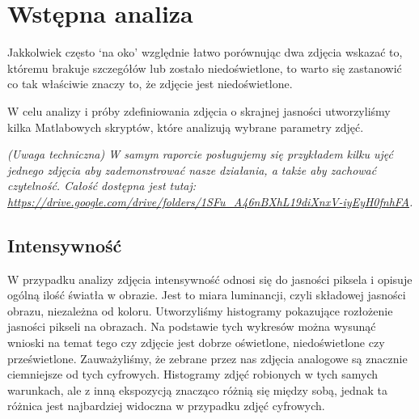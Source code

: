 \documentclass[]{mwart}
\begin{document}
\section{Wstępna analiza}
Jakkolwiek często `na oko' względnie łatwo porównując dwa zdjęcia wskazać
to, któremu brakuje szczegółów lub zostało niedoświetlone, to warto się
zastanowić co tak właściwie znaczy to, że zdjęcie jest niedoświetlone. \newline

W celu analizy i próby zdefiniowania zdjęcia o skrajnej jasności
utworzyliśmy kilka Matlabowych skryptów, które analizują wybrane
parametry zdjęć. \newline

\textit{(Uwaga techniczna) W samym raporcie posługujemy się przykładem
    kilku ujęć jednego zdjęcia aby zademonstrować nasze działania, a także
    aby zachować czytelność. Całość dostępna jest tutaj: \url{https://drive.google.com/drive/folders/1SFu_A46nBXhL19diXnxV-iyEyH0fnhFA}.}


\newpage
\subsection{Intensywność}
W przypadku analizy zdjęcia intensywność odnosi się do jasności piksela i
opisuje ogólną ilość światła w obrazie. Jest to miara luminancji, czyli składowej
jasności obrazu, niezależna od koloru. Utworzyliśmy histogramy pokazujące rozłożenie
jasności pikseli na obrazach. Na podstawie tych wykresów można wysunąć wnioski na
temat tego czy zdjęcie jest dobrze oświetlone, niedoświetlone czy prześwietlone.
Zauważyliśmy, że zebrane przez nas zdjęcia analogowe są znacznie ciemniejsze od
tych cyfrowych. Histogramy zdjęć robionych w tych samych warunkach, ale z inną
ekspozycją znacząco różnią się między sobą, jednak ta różnica jest najbardziej
widoczna w przypadku zdjęć cyfrowych.
\end{document}
